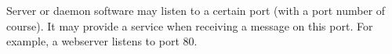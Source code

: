 Server or daemon software may listen to a certain port (with a port number of course). It may provide a service when receiving a message on this port.
For example, a webserver listens to port 80.